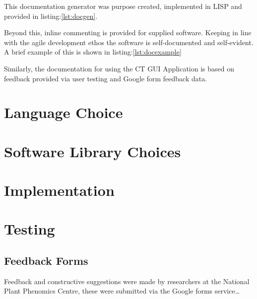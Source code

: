 \documentclass[11pt]{report}
\begin{document}
This documentation generator was purpose created, implemented in LISP and provided in listing:\ref{lst:docgen}.

Beyond this, inline commenting is provided for supplied software. Keeping in line with the agile development ethos the software is self-documented and self-evident. A brief example of this is shown in listing:\ref{lst:docexample}

Similarly, the documentation for using the CT GUI Application is based on feedback provided via user testing and Google form feedback data.
\section{Language Choice}
\label{sec-2-6}
\section{Software Library Choices}
\label{sec-2-7}
\section{Implementation}
\label{sec-2-8}

\section{Testing}
\label{sec-2-9}
\subsection{Feedback Forms}
\label{sec-2-9-1}
Feedback and constructive suggestions were made by researchers at the National Plant Phenomics Centre, these were submitted via the Google forms service\ldots{}
\end{document}
